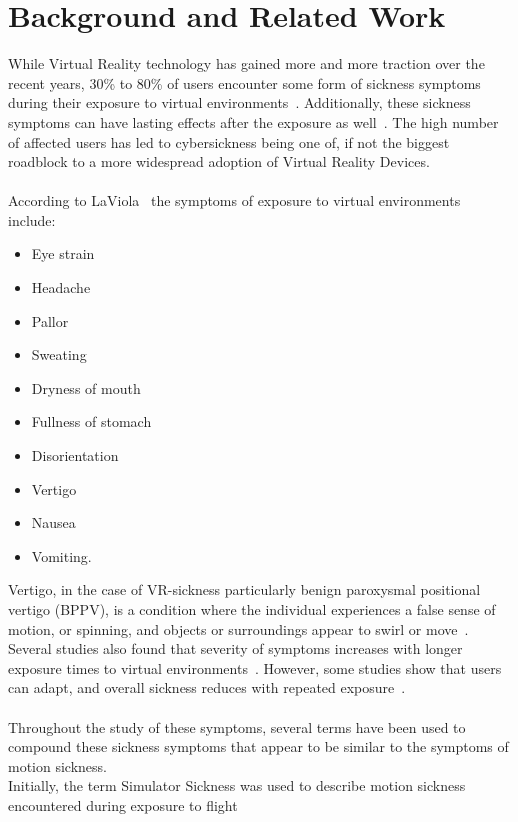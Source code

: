 \chapter{Background and Related Work}\label{ch:background-and-related-work}

While Virtual Reality technology has gained more and more traction over the recent years, 30\% to 80\% of users
encounter some form of sickness symptoms during their exposure to virtual environments~\cite{Rebenitsch2016}.
Additionally, these sickness symptoms can have lasting effects after the exposure as well~\cite{LaViola2000}.
The high number of affected users has led to cybersickness being one of, if not the biggest roadblock to a more
widespread adoption of Virtual Reality Devices.
\\
\\
According to LaViola~\cite{LaViola2000} the symptoms of exposure to virtual environments include:
\begin{itemize}
    \item Eye strain
    \item Headache
    \item Pallor
    \item Sweating
    \item Dryness of mouth
    \item Fullness of stomach
    \item Disorientation
    \item Vertigo
    \item Nausea
    \item Vomiting.
\end{itemize}
Vertigo, in the case of VR-sickness particularly benign paroxysmal positional vertigo (BPPV), is a condition where the
individual experiences a false sense of motion, or spinning, and objects or surroundings appear to swirl or
move~\cite{Post2010}.
\\
Several studies also found that severity of symptoms increases with longer exposure times to virtual environments~\cite{Ruddle2004,Min2004,Duzmanska2018}.
However, some studies show that users can adapt, and overall sickness reduces with repeated exposure~\cite{Hill2000}.
\\
\\
Throughout the study of these symptoms, several terms have been used to compound these sickness symptoms that appear
to be similar to the symptoms of motion sickness.
\\
Initially, the term Simulator Sickness was used to describe motion sickness encountered during exposure to flight
